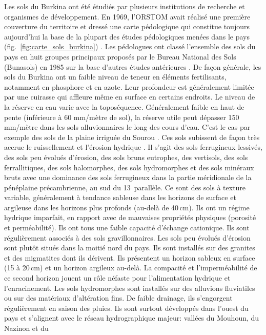 \documentclass[a4paper,11pt]{article}
\begin{document}
Les sols du Burkina ont été étudiés par plusieurs institutions de
recherche et organismes de développement. En 1969, l'ORSTOM avait
réalisé une première couverture du territoire et dressé une carte
pédologique qui constitue toujours aujourd'hui la base de la plupart
des études pédologiques menées dans le pays
(fig.~\ref{fig:carte_sols_burkina}) \cite{BUNASOLS_1985}.  Les
pédologues ont classé l'ensemble des sols du pays en huit groupes
principaux proposés par le Bureau National des Sols (Bunasols) en 1985
sur la base d'autres études antérieures \cite{PERON_1975}. De façon
générale, les sols du Burkina ont un faible niveau de teneur en
éléments fertilisants, notamment en phosphore et en azote. Leur
profondeur est généralement limitée par une cuirasse qui affleure même
en surface en certains endroits. Le niveau de la réserve en eau varie
avec la toposéquence. Généralement faible en haut de pente (inférieure
à 60 mm/mètre de sol), la réserve utile peut dépasser 150 mm/mètre
dans les sols alluvionnaires le long des cours d'eau. C'est le cas par
exemple des sols de la plaine irriguée du Sourou
\cite{SOMENICOU_1983}. Ces sols subissent de façon très accrue le
ruissellement et l'érosion hydrique \cite{Roose_2004}. Il s'agit des
sols ferrugineux lessivés, des sols peu évolués d'érosion, des sols
bruns eutrophes, des vertisols, des sols ferrallitiques, des sols
halomorphes, des sols hydromorphes et des sols minéraux bruts avec une
dominance des sols ferrugineux dans la partie méridionale de la
pénéplaine précambrienne, au sud du 13\ieme\, parallèle. Ce sont des
sols à texture variable, généralement à tendance sableuse dans les
horizons de surface et argileuse dans les horizons plus profonds
(au-delà de 40\,cm). Ils ont un régime hydrique imparfait, en rapport
avec de mauvaises propriétés physiques (porosité et perméabilité). Ils
ont tous une faible capacité d'échange cationique. Ils sont
régulièrement associés à des sols gravillonnaires. Les sols peu
évolués d'érosion sont plutôt situés dans la moitié nord du pays. Ils
sont installés sur des granites et des migmatites dont ils
dérivent. Ils présentent un horizon sableux en surface (15 à 20\,cm)
et un horizon argileux au-delà. La compacité et l'imperméabilité de ce
second horizon jouent un rôle néfaste pour l'alimentation hydrique et
l'enracinement. Les sols hydromorphes sont installés sur des alluvions
fluviatiles ou sur des matériaux d'altération fins. De faible
drainage, ils s'engorgent régulièrement en saison des pluies. Ils sont
surtout développés dans l'ouest du pays et s'alignent avec le réseau
hydrographique majeur: vallées du Mouhoun, du Nazinon et du
\end{document}

